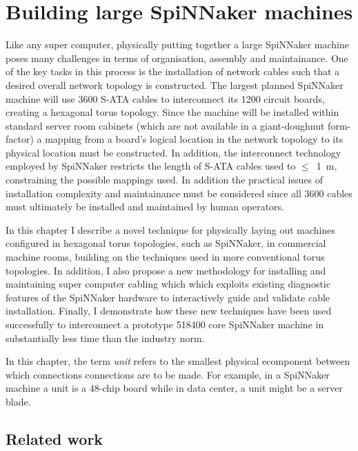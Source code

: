 \chapter{Building large SpiNNaker machines}
	
	Like any super computer, physically putting together a large SpiNNaker
	machine poses many challenges in terms of organisation, assembly and
	maintainance. One of the key tasks in this process is the installation of
	network cables such that a desired overall network topology is constructed.
	The largest planned SpiNNaker machine will use \num{3600} S-ATA
	\cite{sata3spec} cables to interconnect its \num{1200} circuit boards,
	creating a hexagonal torus topology. Since the machine will be installed
	within standard server room cabinets (which are not available in a
	giant-doughnut form-factor) a mapping from a board's logical location in the
	network topology to its physical location must be constructed. In addition,
	the interconnect technology employed by SpiNNaker restricts the length of
	S-ATA cables used to $\le$~\SI{1}{\meter}, constraining the possible mappings
	used. In addition the practical issues of installation complexity and
	maintainance must be considered since all \num{3600} cables must ultimately
	be installed and maintained by human operators.
	
	In this chapter I describe a novel technique for physically laying out
	machines configured in hexagonal torus topologies, such as SpiNNaker, in
	commercial machine rooms, building on the techniques used in more
	conventional torus topologies. In addition, I also propose a new methodology
	for installing and maintaining super computer cabling which which exploits
	existing diagnostic features of the SpiNNaker hardware to interactively guide
	and validate cable installation. Finally, I demonstrate how these new
	techniques have been used successfully to interconnect a prototype
	\num{518400} core SpiNNaker machine in substantially less time than the
	industry norm.
	
	In this chapter, the term \emph{unit} refers to the smallest physical
	ecomponent between which connections connections are to be made. For example,
	in a SpiNNaker machine a unit is a 48-chip board while in data center, a unit
	might be a server blade.
	
	\section{Related work}
		
